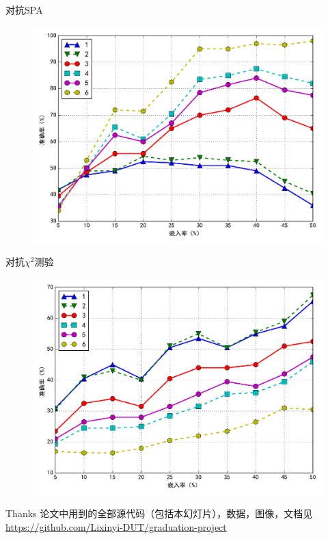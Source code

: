 \documentclass[14pt]{Bredelebeamer}
\begin{document}
\begin{frame}{对抗SPA}
	\begin{figure}
    \centering
		\includegraphics[width=.9\textwidth]{images/spaprediction}
	\end{figure}
\end{frame}

\begin{frame}{对抗$\chi^2$测验}
	\begin{figure}
    \centering
		\includegraphics[width=.9\textwidth]{images/chi2prediction}
	\end{figure}
\end{frame}

\begin{frame}{Thanks}
	\centering
	论文中用到的全部源代码（包括本幻灯片），数据，图像，文档见\\
	\faChain \url{https://github.com/Lixinyi-DUT/graduation-project}
\end{frame}
\end{document}
